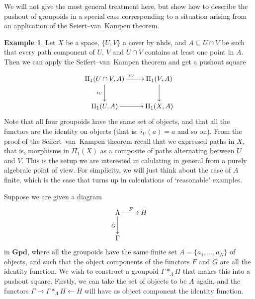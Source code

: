\documentclass{tufte-handout}
\def\Gpd {\mathbf{Gpd}}
\theoremstyle{definition}
\newtheorem{example}{Example}
\begin{document}
We will not give the most general treatment here, but show how to describe the pushout 
of groupoids in a special case corresponding to a situation arising from an application 
of the Seiert--van~Kampen theorem.

\begin{example}

Let $X$ be a space, $\{U,V\}$ a cover by nhds, and $A\subseteq U\cap V$ be such that 
every path component of $U$, $V$ and $U\cap V$ contains at least one point in $A$. Then 
we can apply the Seifert--van~Kampen theorem and get a pushout square
\[
\xymatrix{
	\Pi_1(U\cap V,A) \ar[r]^{i_V} \ar[d]_{i_U} & \Pi_1(V,A) \ar[d]\\
	\Pi_1(U,A) \ar[r] & \Pi_1(X,A)
}
\]
Note that all four groupoids have the same set of objects, and that all 
the functors are the identity on objects (that is: $i_U(a) = a$ and so on). 
From the proof of the Seifert--van~Kampen theorem recall that we expressed paths in $X$,
that is, morphisms in $\Pi_1(X)$ as a composite of paths alternating between $U$ and $V$.
This is the setup we are interested in calulating in general from a purely algebraic point 
of view. For simplicity, we will just think about the case of $A$ finite, which is the case that turns up in calculations of `reasonable' examples.
\end{example}

Suppose we are given a diagram
\[
\xymatrix{
	\Lambda \ar[r]^F \ar[d]_G & H  \\
	\Gamma 
}
\]
in $\Gpd$, where all the groupoids have the same finite set $A = \{a_1,\ldots,a_N\}$ of 
objects, and such that the object components of the functors $F$ and $G$ are all the identity 
function. We wish to construct a groupoid $\Gamma\ast_\Lambda H$ that makes this into a 
pushout square. Firstly, we can take the set of objects to be $A$ again, and the 
functors $\Gamma \to \Gamma\ast_\Lambda H \leftarrow H$ will have as object component 
the identity function.
\end{document}
